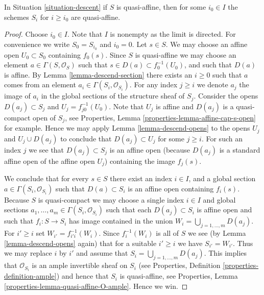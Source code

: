 \begin{lemma}
\label{lemma-limit-quasi-affine}
In Situation \ref{situation-descent} if $S$ is quasi-affine, then
for some $i_0 \in I$ the schemes $S_i$ for $i \geq i_0$ are quasi-affine.
\end{lemma}

\begin{proof}
Choose $i_0 \in I$. Note that $I$ is nonempty as the limit is directed.
For convenience we write $S_0 = S_{i_0}$ and $i_0 = 0$.
Let $s \in S$. We may choose an affine open
$U_0 \subset S_0$ containing $f_0(s)$. Since $S$ is quasi-affine
we may choose an element $a \in \Gamma(S, \mathcal{O}_S)$ such
that $s \in D(a) \subset f_0^{-1}(U_0)$, and such that
$D(a)$ is affine. By Lemma \ref{lemma-descend-section}
there exists an $i \geq 0$ such that $a$
comes from an element $a_i \in \Gamma(S_i, \mathcal{O}_{S_i})$.
For any index $j \geq i$ we denote $a_j$
the image of $a_i$ in the global sections of the
structure sheaf of $S_j$.
Consider the opens $D(a_j) \subset S_j$
and $U_j = f_{j0}^{-1}(U_0)$. Note that
$U_j$ is affine and $D(a_j)$ is a quasi-compact open of $S_j$,
see Properties, Lemma \ref{properties-lemma-affine-cap-s-open}
for example. Hence we may apply Lemma \ref{lemma-descend-opens} to the opens
$U_j$ and $U_j \cup D(a_j)$ to conclude that
$D(a_j) \subset U_j$ for some  $j \geq i$.
For such an index $j$ we see that $D(a_j) \subset S_j$ is an affine open
(because $D(a_j)$ is a standard affine open of the affine open $U_j$)
containing the image $f_j(s)$.

\medskip\noindent
We conclude that for every $s \in S$ there exist
an index $i \in I$, and a global section
$a \in \Gamma(S_i, \mathcal{O}_{S_i})$
such that $D(a) \subset S_i$ is an affine open
containing $f_i(s)$. Because $S$ is quasi-compact we
may choose a single index $i \in I$ and global sections
$a_1, \ldots, a_m \in \Gamma(S_i, \mathcal{O}_{S_i})$
such that each $D(a_j) \subset S_i$ is affine open
and such that $f_i : S \to S_i$ has image contained
in the union $W_i = \bigcup_{j = 1, \ldots, m} D(a_j)$.
For $i' \geq i$ set $W_{i'} = f_{i'i}^{-1}(W_i)$.
Since $f_i^{-1}(W_i)$ is all of $S$ we see
(by Lemma \ref{lemma-descend-opens} again)
that for a suitable $i' \geq i$ we
have $S_{i'} = W_{i'}$. Thus we may replace $i$ by
$i'$ and assume that $S_i = \bigcup_{j = 1, \ldots, m} D(a_j)$.
This implies that $\mathcal{O}_{S_i}$ is an ample invertible
sheaf on $S_i$ (see Properties, Definition \ref{properties-definition-ample})
and hence that $S_i$ is quasi-affine, see
Properties, Lemma \ref{properties-lemma-quasi-affine-O-ample}.
Hence we win.
\end{proof}

